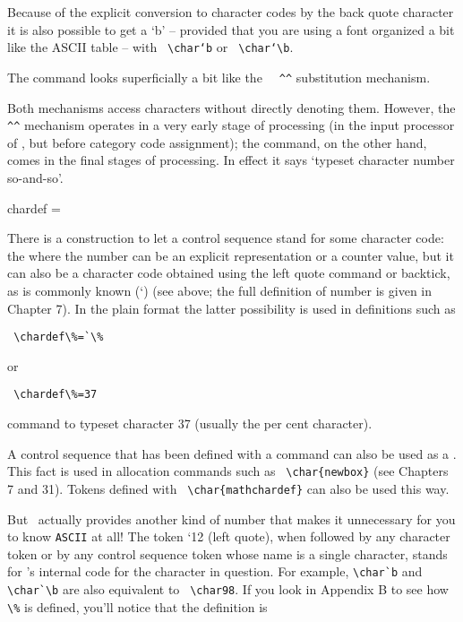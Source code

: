 Because of the explicit conversion to character codes by the back quote character it is also possible
to get a ‘b’ – provided that you are using a font organized a bit like the ASCII table – with \verb+ \char‘b+
or \verb+ \char‘\b+.

The \cmd{\char} command looks superficially a bit like the \verb+  ^^+ substitution mechanism.

Both mechanisms access characters without directly denoting them. However, the \verb+ ^^+ mechanism
operates in a very early stage of processing (in the input processor of \tex, but before category
code assignment); the \cmd{\char} command, on the other hand, comes in the final stages of processing.
In effect it says ‘typeset character number so-and-so’.


\begin{docCommand*}{chardef} {=}

There is a construction to let a control sequence stand for some character code: the \cmd{\chardef}
where the number can be an explicit representation or a counter value, but it can also be a character
code obtained using the left quote command or backtick, as is commonly known (\textquoteleft) (see above; the full definition of number is given in Chapter 7). In the plain format the latter possibility is used in definitions such as
\end{docCommand*}

\verb+ \chardef\%=`\%+

or 

\verb+ \chardef\%=37   +

command to typeset character 37 (usually the per cent character).

A control sequence that has been defined with a \cmd{\chardef} command can also be used as a .
This fact is used in allocation commands such as \verb+ \char{newbox}+ (see Chapters 7 and 31). Tokens defined
with \verb+ \char{mathchardef}+ can also be used this way.


But \tex\ actually provides another kind of number that makes it unnecessary
for you to know \texttt{ASCII} at all! The token `12 (left quote), when followed by
any character token or by any control sequence token whose name is a single character,
stands for \tex's internal code for the character in question. For example, \verb+\char`b+ and
\verb+ \char`\b+ are also equivalent to \verb+ \char98+. If you look in Appendix B to see how \verb+ \%+ is
defined, you'll notice that the definition is


